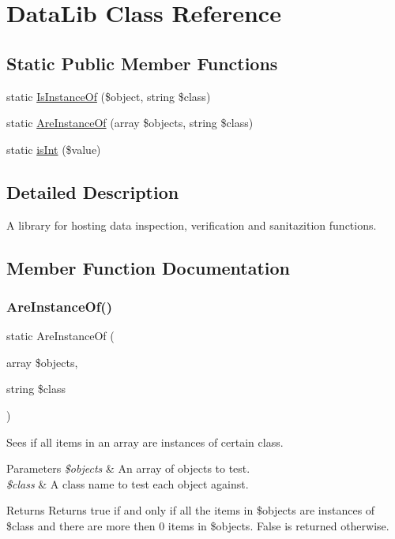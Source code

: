 \hypertarget{class_data_lib}{}\section{Data\+Lib Class Reference}
\label{class_data_lib}
\subsection*{Static Public Member Functions}
\begin{DoxyCompactItemize}
\item 
static \hyperlink{class_data_lib_a4ab5c189422f1366403e4375a42673d1}{Is\+Instance\+Of} (\$object, string \$class)
\item 
static \hyperlink{class_data_lib_a2bff9a99c41391c309a7618d522c8f16}{Are\+Instance\+Of} (array \$objects, string \$class)
\item 
static \hyperlink{class_data_lib_a60cb59e0d64619154c155046e6e4ca66}{is\+Int} (\$value)
\end{DoxyCompactItemize}


\subsection{Detailed Description}
A library for hosting data inspection, verification and sanitazition functions. 

\subsection{Member Function Documentation}
\mbox{\label{class_data_lib_a2bff9a99c41391c309a7618d522c8f16}} 
\subsubsection{\texorpdfstring{Are\+Instance\+Of()}{AreInstanceOf()}}
{\footnotesize\ttfamily static Are\+Instance\+Of (\begin{DoxyParamCaption}\item[{array}]{\$objects,  }\item[{string}]{\$class }\end{DoxyParamCaption})\hspace{0.3cm}{\ttfamily [static]}}

Sees if all items in an array are instances of certain class. 
\begin{DoxyParams}{Parameters}
{\em \$objects} & An array of objects to test. \\
\hline
{\em \$class} & A class name to test each object against. \\
\hline
\end{DoxyParams}
\begin{DoxyReturn}{Returns}
Returns true if and only if all the items in \$objects are instances of \$class and there are more then 0 items in \$objects. False is returned otherwise. 
\end{DoxyReturn}

